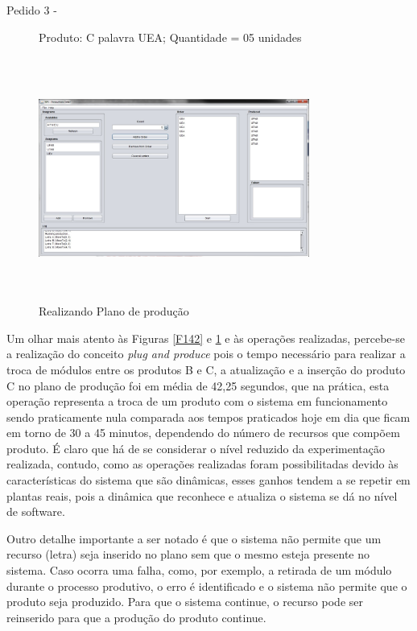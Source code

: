 \documentclass[10pt,letterpaper,twocolumn]{IEEEtran}
\begin{document}
	\begin{description}
		\item[Pedido 3 -] Produto: C  palavra UEA; Quantidade = 05 unidades
	\end{description} 
	
	\begin{figure}[!h]
		\centering
		\includegraphics[width=8.9cm, height=8cm]{MeDSE_imagens/F113_SIAPE_PLANO_2_3.jpg} 
		\caption{Realizando Plano de produção}
		\label{F113}
	\end{figure}
	
	Um olhar mais atento às Figuras \ref{F142} e \ref{F113} e às operações realizadas, percebe-se a 
	realização do conceito \textit{plug and produce} pois o tempo necessário para realizar a troca 
	de módulos entre os produtos B e C, a atualização e a inserção do produto C no plano de produção 
	foi em média de 42,25 segundos, que na prática, esta operação representa a troca de um produto 
	com o sistema em funcionamento sendo praticamente nula comparada aos tempos praticados hoje em 
	dia que ficam em torno de 30 a 45 minutos, dependendo do número de recursos que compõem  produto. 
	É claro que há de se considerar o nível reduzido da experimentação realizada, contudo, como as 
	operações realizadas foram possibilitadas devido às características do sistema que são dinâmicas, 
	esses ganhos tendem a se repetir em plantas reais, pois a dinâmica que reconhece e atualiza o 
	sistema se dá no nível de software.\par 
	Outro detalhe importante a ser notado é que o sistema não permite que um recurso (letra) seja 
	inserido no plano sem que o mesmo esteja presente no sistema. Caso ocorra uma falha, como, por 
	exemplo, a retirada de um módulo durante o processo produtivo, o erro é identificado e o sistema 
	não permite que o produto seja produzido. Para que o sistema continue, o recurso pode ser reinserido 
	para que a produção do produto continue.\par    
	
\end{document}
